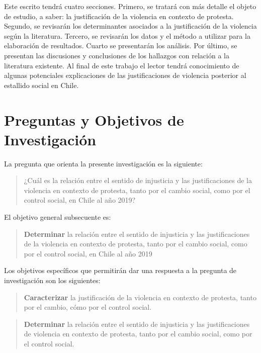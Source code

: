 \documentclass[12pt,twoside]{templates/facsothesis}
\begin{document}
Este escrito tendrá cuatro secciones. Primero, se tratará con más detalle el objeto de estudio, a saber: la justificación de la violencia en contexto de protesta. Segundo, se revisarán los determinantes asociados a la justificación de la violencia según la literatura. Tercero, se revisarán los datos y el método a utilizar para la elaboración de resultados. Cuarto se presentarán los análisis. Por último, se presentan las discusiones y conclusiones de los hallazgos con relación a la literatura existente. Al final de este trabajo el lector tendrá conocimiento de algunas potenciales explicaciones de las justificaciones de violencia posterior al estallido social en Chile.

\hypertarget{preguntas-y-objetivos-de-investigaciuxf3n}{%
\chapter{Preguntas y Objetivos de Investigación}\label{preguntas-y-objetivos-de-investigaciuxf3n}}

La pregunta que orienta la presente investigación es la siguiente:

\begin{quote}
¿Cuál es la relación entre el sentido de injusticia y las justificaciones de la violencia en contexto de protesta, tanto por el cambio social, como por el control social, en Chile al año 2019?
\end{quote}

El objetivo general subsecuente es:

\begin{quote}
\textbf{Determinar} la relación entre el sentido de injusticia y las justificaciones de la violencia en contexto de protesta, tanto por el cambio social, como por el control social, en Chile al año 2019
\end{quote}

Los objetivos específicos que permitirán dar una respuesta a la pregunta de investigación son los siguientes:

\begin{quote}
\textbf{Caracterizar} la justificación de la violencia en contexto de protesta, tanto por el cambio, cómo por el control social.
\end{quote}

\begin{quote}
\textbf{Determinar} la relación entre el sentido de injusticia y las justificaciones de violencia en contexto de protesta, tanto por el cambio social, como por el control social.
\end{quote}
\end{document}
